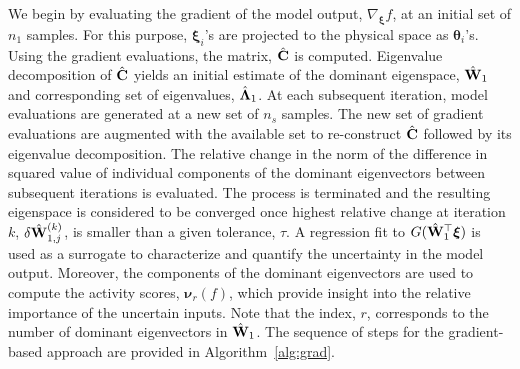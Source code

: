 We begin by evaluating the gradient of the model output, $\nabla_{\bm{\xi}}f$,
at an initial set of $n_1$ samples.  For this purpose, $\bm{\xi}_i$'s are
projected to the physical space as $\bm{\theta}_i$'s. 
Using the gradient
evaluations, the matrix, $\hat{\mathbf{{C}}}$ is computed. Eigenvalue decomposition
of $\hat{\mathbf{{C}}}$ yields an initial estimate of the dominant eigenspace,
$\hat{\mathbf{{W}}}_1$ and corresponding set of eigenvalues,
$\hat{\mathbf{{\Lambda}}}_1$.  At each subsequent iteration, model evaluations are
generated at a new set of $n_s$ samples. The new set of gradient evaluations
are augmented with the available set to re-construct $\hat{\mathbf{{C}}}$ followed
by its eigenvalue decomposition. The relative change in the norm of the
difference in squared value of individual components of the dominant
eigenvectors between subsequent iterations is evaluated. The process is
terminated and the resulting eigenspace is considered to be converged once
highest relative change at iteration $k$, $\delta \hat{\mathbf{{W}}}_{1,j}^{(k)}$,
is smaller than a given tolerance, $\tau$.  A regression fit to
$G(\hat{\mathbf{{W}}}_1^\top\bm{\xi})$ is used as a surrogate to characterize and
quantify the uncertainty in the model output. Moreover, the components of the
dominant eigenvectors are used to compute the activity scores, $\bm{\nu}_r(f)$,
which provide insight into the relative importance of the uncertain inputs.
Note that the index, $r$, corresponds to the number of dominant eigenvectors in
$\hat{\mathbf{{W}}}_1$. The sequence of steps for the gradient-based approach are
provided in Algorithm~\ref{alg:grad}.


